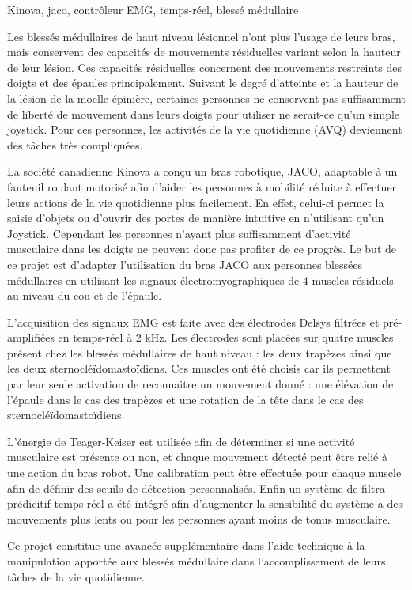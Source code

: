 \documentclass[letterpaper, twoside, 12pt, memoire, creativecommons, hyperref]{thETS}
\begin{document}
\begin{sommaire}{Kinova, jaco, contrôleur EMG, temps-réel, blessé médullaire}

Les blessés médullaires de haut niveau lésionnel n’ont plus l’usage de leurs bras, mais conservent des capacités de mouvements résiduelles variant selon la hauteur de leur lésion. Ces capacités résiduelles concernent des mouvements restreints des doigts et des épaules principalement. Suivant le degré d’atteinte et la hauteur de la lésion de la moelle épinière, certaines personnes ne conservent pas suffisamment de liberté de mouvement dans leurs doigts pour utiliser ne serait-ce qu’un simple joystick. Pour ces personnes, les activités de la vie quotidienne (AVQ) deviennent des tâches très compliquées. 

La société canadienne Kinova a conçu un bras robotique, JACO, adaptable à un fauteuil roulant motorisé afin d’aider les personnes à mobilité réduite à effectuer leurs actions de la vie quotidienne plus facilement. En effet, celui-ci permet la saisie d’objets ou d’ouvrir des portes de manière intuitive en n’utilisant qu’un Joystick. Cependant les personnes n’ayant plus suffisamment d’activité musculaire dans les doigts ne peuvent donc pas profiter de ce progrès. Le but de ce projet est d’adapter l’utilisation du bras JACO aux personnes blessées médullaires en utilisant les signaux électromyographiques de 4 muscles résiduels au niveau du cou et de l’épaule. 

L’acquisition des signaux EMG est faite avec des électrodes Delsys filtrées et pré-amplifiées en temps-réel à 2 kHz. Les électrodes sont placées sur quatre muscles présent chez les blessés médullaires de haut niveau : les deux trapèzes ainsi que les deux sternocléïdomastoïdiens. Ces muscles ont été choisis car ils permettent par leur seule activation de reconnaitre un mouvement donné : une élévation de l’épaule dans le cas des trapèzes et une rotation de la tête dans le cas des sternocléïdomastoïdiens.

L’énergie de Teager-Keiser est utilisée afin de déterminer si une activité musculaire est présente ou non, et chaque mouvement détecté peut être relié à une action du bras robot. Une calibration peut être effectuée pour chaque muscle afin de définir des seuils de détection personnalisés. Enfin un système de filtra prédicitif  temps réel a été intégré afin d’augmenter la sensibilité du système a des mouvements plus lents ou pour les personnes ayant moins de tonus musculaire.

Ce projet constitue une avancée supplémentaire dans l’aide technique à la manipulation apportée aux blessés médullaire dans l’accomplissement de leurs tâches de la vie quotidienne. 



\end{sommaire}
\end{document}
